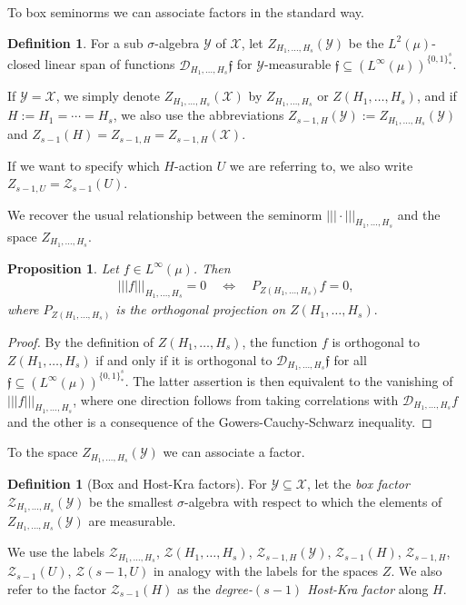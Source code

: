 \documentclass[11pt]{amsart}
\newtheorem{proposition}[lemma]{Proposition}
\theoremstyle{definition}
\newtheorem{definition}[lemma]{Definition}
\newcommand{\CD}{{\mathcal D}}
\newcommand{\CX}{{\mathcal X}}
\newcommand{\CY}{{\mathcal Y}}
\newcommand{\CZ}{{\mathcal Z}}
\newcommand{\nnorm}[1]{\lvert\!|\!| #1|\!|\!\rvert}
\newcommand{\1}{{\mathbf{1}}}
\begin{document}
To box seminorms we can associate factors in the standard way.
\begin{definition}
    For a sub $\sigma$-algebra $\CY$ of $\CX$, let $Z_{H_1, \ldots, H_s}(\CY)$ be the $L^2(\mu)$-closed linear span of functions $\CD_{H_1, \ldots, H_s}\mathfrak f$ for $\CY$-measurable $\mathfrak{f}\subseteq (L^\infty(\mu))^{\{0,1\}^s_*}$.
    
    If $\CY = \CX$, we simply denote $Z_{H_1, \ldots, H_s}(\CX)$ by $Z_{H_1, \ldots, H_s}$ or $Z(H_1, \ldots, H_s)$, and if $H:=H_1 = \cdots = H_s$, we also use the abbreviations $Z_{s-1,H}(\CY):=Z_{H_1, \ldots, H_s}(\CY)$ and 
    $Z_{s-1}(H)=Z_{s-1,H}=Z_{s-1,H}(\CX)$. 

    If we want to specify which $H$-action $U$ we are referring to, we also write $Z_{s-1, U} = \CZ_{s-1}(U)$.
\end{definition}

We recover the usual relationship between the seminorm $\nnorm{\cdot}_{H_1, \ldots, H_s}$ and the space $Z_{H_1, \ldots, H_s}$.
\begin{proposition}\label{P: seminorms vs. algebras}
    Let $f\in L^\infty(\mu)$. Then
    \begin{align*}
        \nnorm{f}_{H_1, \ldots, H_s} = 0\quad \iff \quad {P_{Z(H_1, \ldots, H_s)}f= 0,}
    \end{align*}
    where $P_{Z(H_1, \ldots, H_s)}$ is the orthogonal projection on $Z(H_1, \ldots, H_s).$
\end{proposition}
\begin{proof}
    By the definition of $Z(H_1, \ldots, H_s)$, the function $f$ is orthogonal to $Z(H_1, \ldots, H_s)$ if and only if it is orthogonal to $\CD_{H_1,\ldots, H_s}\mathfrak{f}$ for all $\mathfrak{f}\subseteq (L^\infty(\mu))^{\{0,1\}^s_*}$.
    The latter assertion is then equivalent to the vanishing of $\nnorm{f}_{H_1, \ldots, H_s}$, where one direction follows from taking correlations with $\CD_{H_1,\ldots, H_s}f$ and the other is a consequence of the Gowers-Cauchy-Schwarz inequality.
\end{proof}

To the space $Z_{H_1, \ldots, H_s}(\CY)$ we can associate a factor.

\begin{definition}[Box and Host-Kra factors]
    For $\CY\subseteq \CX$, let the \textit{box factor} $\CZ_{H_1, \ldots, H_s}(\CY)$ be the smallest $\sigma$-algebra with respect to which the elements of $Z_{H_1, \ldots, H_s}(\CY)$ are measurable. 

    We use the labels $\CZ_{H_1, \ldots, H_s}$, $\CZ(H_1, \ldots, H_s)$, $\CZ_{s-1,H}(\CY)$, $\CZ_{s-1}(H)$, $\CZ_{s-1,H}$, $\CZ_{s-1}(U)$, $\CZ(s-1,U)$  in analogy with the labels for the spaces $Z$. {We also refer to the factor $\CZ_{s-1}(H)$ as the \textit{degree-$(s-1)$ Host-Kra factor} along $H$.}
\end{definition}
\end{document}
